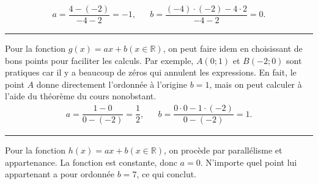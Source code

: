 \documentclass[12pt]{paper}
\theoremstyle{plain}
\theoremstyle{definition}
\newcommand{\R}{\mathbb{R}}
\begin{document}
{	\begin{align*}
		a = \dfrac{4 - (-2)}{-4 - 2} = -1, && b = \dfrac{(-4)\cdot(-2) - 4\cdot2}{-4-2} = 0.
	\end{align*}
	
	\hrule\vspace{10pt}
	
	Pour la fonction $g(x) = ax+b (x\in\R)$, on peut faire idem en choisissant de bons points pour faciliter les calculs.
	Par exemple, $A(0;1)$ et $B(-2;0)$ sont pratiques car il y a beaucoup de zéros qui annulent les expressions.
	En fait, le point $A$ donne directement l'ordonnée à l'origine $b=1$, mais on peut calculer à l'aide du théorème du cours nonobstant.
	\begin{align*}
		a = \dfrac{1-0}{0-(-2)} = \dfrac12, && b = \dfrac{0 \cdot0 - 1 \cdot (-2)}{0-(-2)} = 1.
	\end{align*}
	
	\hrule\vspace{10pt}
	
	Pour la fonction $h(x) = ax+b (x\in\R)$, on procède par parallélisme et appartenance.
	La fonction est constante, donc $a=0$.
	N'importe quel point lui appartenant a pour ordonnée $b=7$, ce qui conclut.

}
\end{document}
